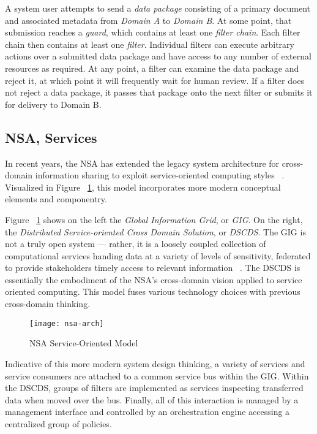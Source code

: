 A system user attempts to send a \textit{data package} consisting of a primary document and associated metadata from \textit{Domain A} to \textit{Domain B}.  At some point, that submission reaches a \textit{guard}, which contains at least one \textit{filter chain}.  Each filter chain then contains at least one \textit{filter}.  Individual filters can execute arbitrary actions over a submitted data package and have access to any number of external resources as required.  At any point, a filter can examine the data package and reject it, at which point it will frequently wait for human review.  If a filter does not reject a data package, it passes that package onto the next filter or submits it for delivery to Domain B.

\subsection{NSA, Services}
In recent years, the NSA has extended the legacy system architecture for cross-domain information sharing to exploit service-oriented computing styles ~\cite{proposal:nsa-arch}.  Visualized in Figure ~\ref{fig:model:conceptual-model-services}, this model incorporates more modern conceptual elements and componentry.

Figure ~\ref{fig:model:conceptual-model-services} shows on the left the \textit{Global Information Grid}, or \textit{GIG}.  On the right, the \textit{Distributed Service-oriented Cross Domain Solution}, or \textit{DSCDS}.  The GIG is not a truly open system --- rather, it is a loosely coupled collection of computational services handing data at a variety of levels of sensitivity, federated to provide stakeholders timely access to relevant information ~\cite{proposal:gig-arch}.  The DSCDS is essentially the embodiment of the NSA's cross-domain vision applied to service oriented computing.  This model fuses various technology choices with previous cross-domain thinking.

\begin{figure}[!t]
\centering
\texttt{[image: nsa-arch]}
\caption{NSA Service-Oriented Model}
\label{fig:model:conceptual-model-services}
\end{figure}

Indicative of this more modern system design thinking, a variety of services and service consumers are attached to a common service bus within the GIG.  Within the DSCDS, groups of filters are implemented as services inspecting transferred data when moved over the bus.  Finally, all of this interaction is managed by a management interface and controlled by an orchestration engine accessing a centralized group of policies.

